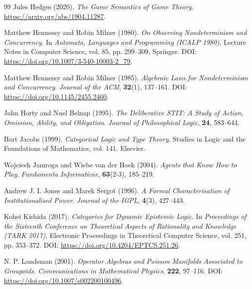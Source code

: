 \documentclass[11pt,a4paper]{article}
\numberwithin{equation}{section}
\theoremstyle{definition}
\theoremstyle{remark}
\theoremstyle{plain}
\begin{document}
\begin{thebibliography}{99}
Jules Hedges (2020).
\newblock \emph{The Game Semantics of Game Theory}.
\newblock \url{https://arxiv.org/abs/1904.11287}.

Matthew Hennessy and Robin Milner (1980).
\newblock \emph{On Observing Nondeterminism and Concurrency}.
\newblock In \emph{Automata, Languages and Programming (ICALP 1980)}, Lecture Notes in Computer Science, vol. 85, pp. 299--309, Springer.
\newblock DOI: \url{https://doi.org/10.1007/3-540-10003-2_79}.

Matthew Hennessy and Robin Milner (1985).
\newblock \emph{Algebraic Laws for Nondeterminism and Concurrency}.
\newblock \emph{Journal of the ACM}, \textbf{32}(1), 137--161.
\newblock DOI: \url{https://doi.org/10.1145/2455.2460}.

John Horty and Nuel Belnap (1995).
\newblock \emph{The Deliberative STIT: A Study of Action, Omission, Ability, and Obligation}.
\newblock \emph{Journal of Philosophical Logic}, \textbf{24}, 583--644.

Bart Jacobs (1999).
\newblock \emph{Categorical Logic and Type Theory}.
\newblock Studies in Logic and the Foundations of Mathematics, vol. 141. Elsevier.

Wojciech Jamroga and Wiebe van der Hoek (2004).
\newblock \emph{Agents that Know How to Play}.
\newblock \emph{Fundamenta Informaticae}, \textbf{63}(2-3), 185--219.

Andrew J. I. Jones and Marek Sergot (1996).
\newblock \emph{A Formal Characterisation of Institutionalised Power}.
\newblock \emph{Journal of the IGPL}, \textbf{4}(3), 427--443.

Kohei Kishida (2017).
\newblock \emph{Categories for Dynamic Epistemic Logic}.
\newblock In \emph{Proceedings of the Sixteenth Conference on Theoretical Aspects of Rationality and Knowledge (TARK 2017)}, Electronic Proceedings in Theoretical Computer Science, vol. 251, pp. 353--372.
\newblock DOI: \url{https://doi.org/10.4204/EPTCS.251.26}.

N. P. Landsman (2001).
\newblock \emph{Operator Algebras and Poisson Manifolds Associated to Groupoids}.
\newblock \emph{Communications in Mathematical Physics}, \textbf{222}, 97--116.
\newblock DOI: \url{https://doi.org/10.1007/s002200100496}.


\end{thebibliography}
\end{document}
